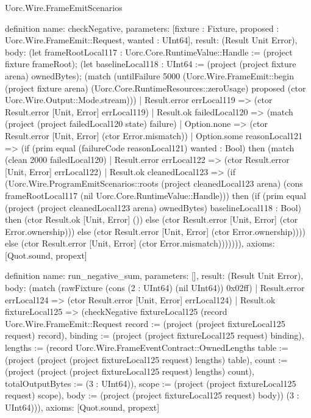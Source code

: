 \begin{lexlean}{Uorc.Wire.FrameEmitScenarios}
\begin{semanticmodule}
definition{
  name: checkNegative,
  parameters: [fixture : Fixture, proposed : Uorc.Wire.FrameEmit::Request, wanted : UInt64],
  result: (Result Unit Error),
  body: (let frameRootLocal117 : Uorc.Core.RuntimeValue::Handle := (project fixture frameRoot); (let baselineLocal118 : UInt64 := (project (project fixture arena) ownedBytes); (match (untilFailure 5000 (Uorc.Wire.FrameEmit::begin (project fixture arena) (Uorc.Core.RuntimeResources::zeroUsage) proposed (ctor Uorc.Wire.Output::Mode.stream)))
    | Result.error errLocal119 => (ctor Result.error [Unit, Error] errLocal119)
    | Result.ok failedLocal120 => (match (project (project failedLocal120 state) failure)
      | Option.none => (ctor Result.error [Unit, Error] (ctor Error.mismatch))
      | Option.some reasonLocal121 => (if (prim equal (failureCode reasonLocal121) wanted : Bool) then (match (clean 2000 failedLocal120)
        | Result.error errLocal122 => (ctor Result.error [Unit, Error] errLocal122)
        | Result.ok cleanedLocal123 => (if (Uorc.Wire.ProgramEmitScenarios::roots (project cleanedLocal123 arena) (cons frameRootLocal117 (nil Uorc.Core.RuntimeValue::Handle))) then (if (prim equal (project (project cleanedLocal123 arena) ownedBytes) baselineLocal118 : Bool) then (ctor Result.ok [Unit, Error] ()) else (ctor Result.error [Unit, Error] (ctor Error.ownership))) else (ctor Result.error [Unit, Error] (ctor Error.ownership)))) else (ctor Result.error [Unit, Error] (ctor Error.mismatch))))))),
  axioms: [Quot.sound, propext]
}

definition{
  name: run_negative_sum,
  parameters: [],
  result: (Result Unit Error),
  body: (match (rawFixture (cons (2 : UInt64) (nil UInt64)) 0x02ff)
    | Result.error errLocal124 => (ctor Result.error [Unit, Error] errLocal124)
    | Result.ok fixtureLocal125 => (checkNegative fixtureLocal125 (record Uorc.Wire.FrameEmit::Request {record := (project (project fixtureLocal125 request) record), binding := (project (project fixtureLocal125 request) binding), lengths := (record Uorc.Wire.FrameEventContract::OwnedLengths {table := (project (project (project fixtureLocal125 request) lengths) table), count := (project (project (project fixtureLocal125 request) lengths) count), totalOutputBytes := (3 : UInt64)}), scope := (project (project fixtureLocal125 request) scope), body := (project (project fixtureLocal125 request) body)}) (3 : UInt64))),
  axioms: [Quot.sound, propext]
}


\end{semanticmodule}
\end{lexlean}
